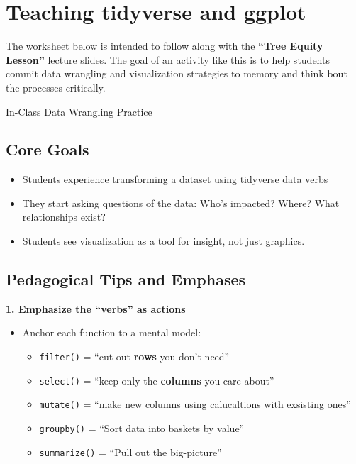 \documentclass[
]{article}
\begin{document}
\section{Teaching tidyverse and
ggplot}\label{teaching-tidyverse-and-ggplot}

The worksheet below is intended to follow along with the \textbf{``Tree
Equity Lesson''} lecture slides. The goal of an activity like this is to
help students commit data wrangling and visualization strategies to
memory and think bout the processes critically.

In-Class Data Wrangling Practice

\subsection{Core Goals}\label{core-goals}

\begin{itemize}
\item
  Students experience transforming a dataset using tidyverse data verbs
\item
  They start asking questions of the data: Who's impacted? Where? What
  relationships exist?
\item
  Students see visualization as a tool for insight, not just graphics.
\end{itemize}

\subsection{Pedagogical Tips and
Emphases}\label{pedagogical-tips-and-emphases}

\textbf{1. Emphasize the ``verbs'' as actions}

\begin{itemize}
\item
  Anchor each function to a mental model:

  \begin{itemize}
  \item
    \texttt{filter()} = ``cut out \textbf{rows} you don't need''
  \item
    \texttt{select()} = ``keep only the \textbf{columns} you care
    about''
  \item
    \texttt{mutate()} = ``make new columns using calucaltions with
    exsisting ones''
  \item
    \texttt{groupby()} = ``Sort data into baskets by value''
  \item
    \texttt{summarize()} = ``Pull out the big-picture''
  \end{itemize}
\end{itemize}
\end{document}
